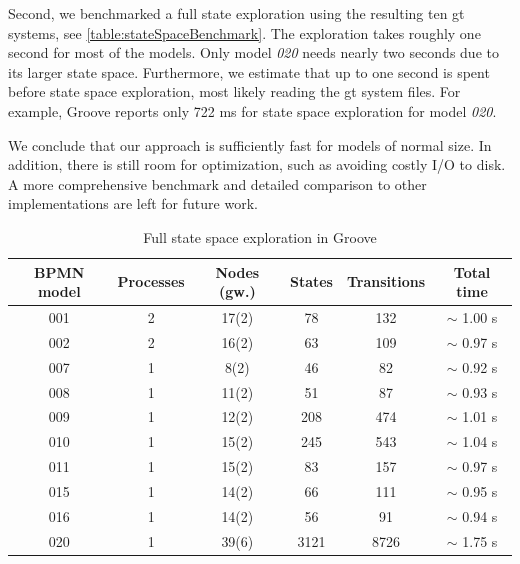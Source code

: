 \documentclass[runningheads]{llncs}
\begin{document}
Second, we benchmarked a full state exploration using the resulting ten \gls*{gt} systems, see \autoref{table:stateSpaceBenchmark}.
The exploration takes roughly one second for most of the models.
Only model \textit{020} needs nearly two seconds due to its larger state space.
Furthermore, we estimate that up to one second is spent before state space exploration, most likely reading the \gls*{gt} system files.
For example, Groove reports only 722 ms for state space exploration for model \textit{020}.

We conclude that our approach is sufficiently fast for models of normal size.
In addition, there is still room for optimization, such as avoiding costly I/O to disk.
A more comprehensive benchmark and detailed comparison to other implementations are left for future work.

\begin{table}[ht]
\centering

\begin{tabular}{| c | c | c || c | c | c |}
 \hline
 BPMN model & Processes & Nodes (gw.) & States & Transitions & Total time \\
 \hline\hline
 001 & 2 & 17(2) & 78 & 132 & $\sim$ 1.00 s \\
 \hline
 002 & 2 & 16(2) & 63 & 109 & $\sim$ 0.97 s \\
 \hline
 007 & 1 & 8(2) & 46 & 82 & $\sim$ 0.92 s \\
 \hline
 008 & 1 & 11(2) & 51 & 87 & $\sim$ 0.93 s \\
 \hline
 009 & 1 & 12(2) & 208 & 474 & $\sim$ 1.01 s \\
 \hline
 010 & 1 & 15(2) & 245 & 543 & $\sim$ 1.04 s \\
 \hline
 011 & 1 & 15(2) & 83 & 157 & $\sim$ 0.97 s \\
 \hline
 015 & 1 & 14(2) & 66 & 111 & $\sim$ 0.95 s \\
 \hline
 016 & 1 & 14(2) & 56 & 91 & $\sim$ 0.94 s \\
 \hline
 020 & 1 & 39(6) & 3121 & 8726 & $\sim$ 1.75 s \\
 \hline
\end{tabular}
\caption[Full state space exploration in Groove]{Full state space exploration in Groove}
\label{table:stateSpaceBenchmark}
\end{table}
\end{document}
